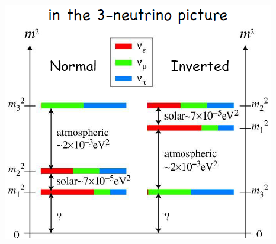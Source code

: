 \documentclass{beamer}
\begin{document}
\begin{frame}
\begin{minipage}[t]{0.80\paperwidth}
\begin{columns}
   \begin{column}{0.50\linewidth}
         \begin{tcolorbox}[colback=UNL@Cream!5,colframe=UNL@Cream!60,title=\textcolor{UMN@Maroon}{\textbf{Neutrino Masses.}}]
   
          \includegraphics[height=0.40\linewidth,width=\linewidth]{THESISPLOTS/New-Physics-PLOTS/neutrino-Mass.png}
         \end{tcolorbox}     
      \end{column} 
  \end{columns}
\end{minipage}
\end{frame}
\end{document}
